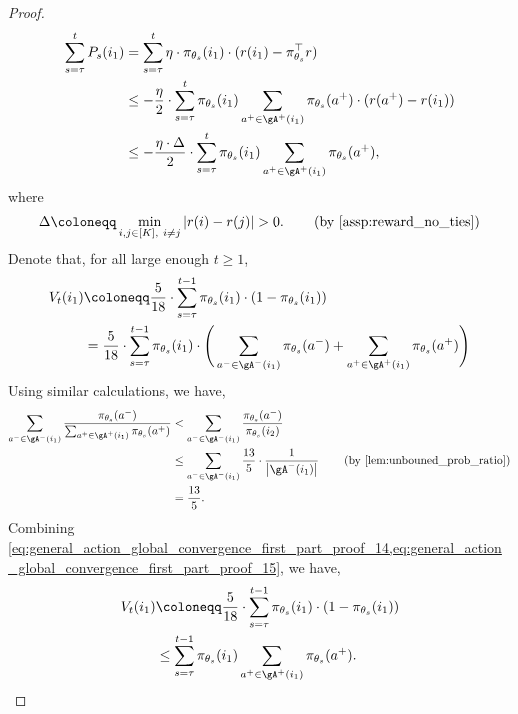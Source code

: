 \begin{proof}
\begin{align}
\label{eq:general_action_global_convergence_first_part_proof_12}
    \sum_{s=\tau}^t P_s(i_1) &= \sum_{s=\tau}^t \eta \cdot \pi_{\theta_s}(i_1) \cdot ( r(i_1) - \pi_{\theta_s}^\top r ) \\
    &\le - \frac{\eta}{2} \cdot \sum_{s=\tau}^t \pi_{\theta_s}(i_1) \sum_{a^+ \in \gA^+(i_1)}{ \pi_{\theta_s}(a^+) \cdot (r(a^+) - r(i_1) ) } \\
    &\le - \frac{\eta \cdot \Delta}{2} \cdot \sum_{s=\tau}^t \pi_{\theta_s}(i_1) \sum_{a^+ \in \gA^+(i_1)}{ \pi_{\theta_s}(a^+) },
\end{align}
where
\begin{align}
\label{eq:general_action_global_convergence_first_part_proof_13}
    \Delta \coloneqq \min_{i, j \in [K], \ i \not= j}{ |r(i) - r(j)| } > 0. \qquad \left( \text{by \cref{assp:reward_no_ties}} \right)
\end{align}
Denote that, for all large enough $t \ge 1$,
\begin{align}
\label{eq:general_action_global_convergence_first_part_proof_14}
    V_t(i_1) &\coloneqq \frac{5}{18} \cdot \sum_{s=\tau}^{t-1}  \pi_{\theta_s}(i_1) \cdot (1-\pi_{\theta_s}(i_1)) \\
    &= \frac{5}{18} \cdot \sum_{s=\tau}^{t-1}  \pi_{\theta_s}(i_1) \cdot \Bigg( \sum_{a^- \in \gA^-(i_1)} \pi_{\theta_s}(a^-) + \sum_{a^+ \in \gA^+(i_1)} \pi_{\theta_s}(a^+) \Bigg)
\end{align}
Using similar calculations, we have,
\begin{align}
\label{eq:general_action_global_convergence_first_part_proof_15}
    \sum_{a^- \in \gA^-(i_1)} \frac{ \pi_{\theta_s}(a^-) }{ \sum_{a^+ \in \gA^+(i_1)} \pi_{\theta_s}(a^+) } &< \sum_{a^- \in \gA^-(i_1)} \frac{ \pi_{\theta_s}(a^-) }{  \pi_{\theta_s}(i_2) } \\
    &\le \sum_{a^- \in \gA^-(i_1)}{ \frac{13}{5} \cdot \frac{1}{\big| \gA^-(i_1) \big|} } \qquad \left( \text{by \cref{lem:unbouned_prob_ratio}} \right) \\
    &= \frac{13}{5}.
\end{align}
Combining \cref{eq:general_action_global_convergence_first_part_proof_14,eq:general_action_global_convergence_first_part_proof_15}, we have,
\begin{align}
\label{eq:general_action_global_convergence_first_part_proof_16}
    V_t(i_1) &\coloneqq \frac{5}{18} \cdot \sum_{s=\tau}^{t-1}  \pi_{\theta_s}(i_1) \cdot (1-\pi_{\theta_s}(i_1)) \\
    &\le \sum_{s=\tau}^{t-1}  \pi_{\theta_s}(i_1) \sum_{a^+ \in \gA^+(i_1)}{ \pi_{\theta_s}(a^+) }.

\end{align}
\end{proof}
